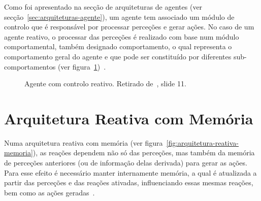 Como foi apresentado na secção de arquiteturas de agentes (ver secção~\ref{sec:arquiteturas-agente}), um agente tem associado um módulo de controlo que é responsável por processar perceções e gerar ações.
No caso de um agente reativo, o processar das perceções é realizado com base num módulo comportamental,
também designado comportamento, o qual representa o comportamento geral do agente e que pode ser constituído por diferentes sub-comportamentos (ver figura~\ref{fig:controle-reativo})~\cite{isel:iasa:slides:arq-agentes-reativos-parte-2}.

\begin{figure}[H]
    \begin{center}
    \end{center}
    \caption{Agente com controlo reativo.
    Retirado de~\cite{isel:iasa:slides:arq-agentes-reativos-parte-2}, slide 11.}\label{fig:controle-reativo}
\end{figure}


\section{Arquitetura Reativa com Memória}\label{sec:arquiteturas-reativa-memoria}

Numa arquitetura reativa com memória (ver figura~\ref{fig:arquitetura-reativa-memoria}), as reações dependem não só das perceções, mas também da memória de perceções anteriores (ou de informação delas derivada) para gerar as
ações. Para esse efeito é necessário manter internamente memória, a qual é atualizada a partir das
perceções e das reações ativadas, influenciando essas mesmas reações, bem como as ações
geradas~\cite{isel:iasa:slides:arq-agentes-reativos-parte-3}.

